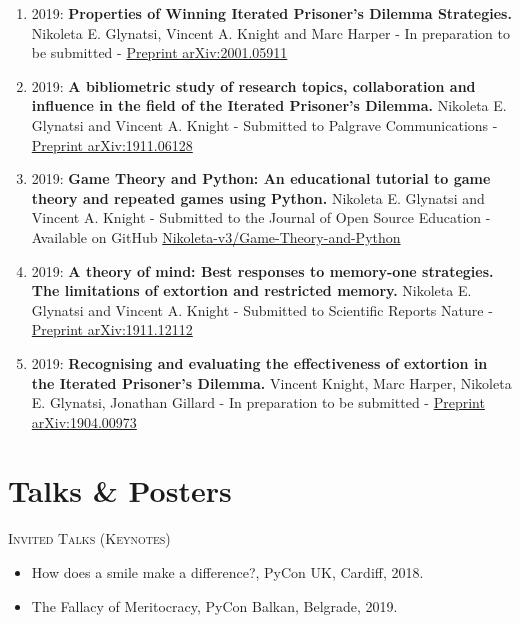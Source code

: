 \begin{enumerate}
	\def\labelenumi{\arabic{enumi}.}
\item 2019: \textbf{Properties of Winning Iterated Prisoner's Dilemma Strategies.} Nikoleta E. Glynatsi, Vincent A. Knight and Marc Harper -
In preparation to be submitted - \href{https://arxiv.org/abs/2001.05911}{Preprint arXiv:2001.05911}
\item 2019: \textbf{A bibliometric study of research topics, collaboration and influence in the field of the Iterated Prisoner's Dilemma.}
Nikoleta E. Glynatsi and Vincent A. Knight -
Submitted to Palgrave Communications - \href{https://arxiv.org/abs/1911.12112}{Preprint arXiv:1911.06128}
\item 2019: \textbf{Game Theory and Python: An educational tutorial to game
theory and repeated games using Python.} Nikoleta E. Glynatsi and Vincent A. Knight -
Submitted to the Journal of Open Source Education - Available on GitHub
\href{https://github.com/Nikoleta-v3/Game-Theory-and-Python}{Nikoleta-v3/Game-Theory-and-Python}
\item 2019: \textbf{A theory of mind: Best responses to memory-one strategies.
The limitations of extortion and restricted memory.} Nikoleta E. Glynatsi and Vincent A. Knight -
Submitted to Scientific Reports Nature -
\href{https://arxiv.org/abs/1911.12112}{Preprint arXiv:1911.12112}
\item 2019: \textbf{Recognising and evaluating the effectiveness of extortion in
the Iterated Prisoner's Dilemma.} Vincent Knight, Marc Harper, Nikoleta E. Glynatsi,
Jonathan Gillard -
In preparation to be submitted -
\href{https://arxiv.org/abs/1904.00973}{Preprint arXiv:1904.00973}
\end{enumerate}

\section*{Talks \& Posters}

\textsc{Invited Talks (Keynotes)}
\begin{itemize}
	\item How does a smile make a difference?, PyCon UK, Cardiff, 2018.
	\item The Fallacy of Meritocracy, PyCon Balkan, Belgrade, 2019.
\end{itemize}

